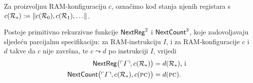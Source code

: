 \begin{lema}\label{lm:NextRegCountprn}
Za proizvoljnu RAM-konfiguraciju $c$, označimo kod stanja njenih registara s $c(\mathcal R_{*}):=\lVert c(\mathcal R_{0}),c(\mathcal R_{1}),\dotsc\rVert$.

Postoje primitivno rekurzivne funkcije $\mathsf{NextReg}^2$ i $\mathsf{NextCount}^3$, koje zadovoljavaju sljedeću parcijalnu specifikaciju: za RAM-instrukciju $I$, i za RAM-kon\-fi\-gu\-ra\-ci\-je $c$ i $d$ takve da $c$ nije završna, te $c\leadsto d$ po instrukciji $I$, vrijedi
\begin{align}
    \mathsf{NextReg}\bigl(\ulcorner I\urcorner,c(\mathcal R_{*})\bigr)&=d(\mathcal R_{*})\text{, i}\\
    \mathsf{NextCount}\bigl(\ulcorner I\urcorner,c(\mathcal R_{*}),c(\textsc{pc})\bigr)&=d(\textsc{pc})\text.
\end{align}
\end{lema}
